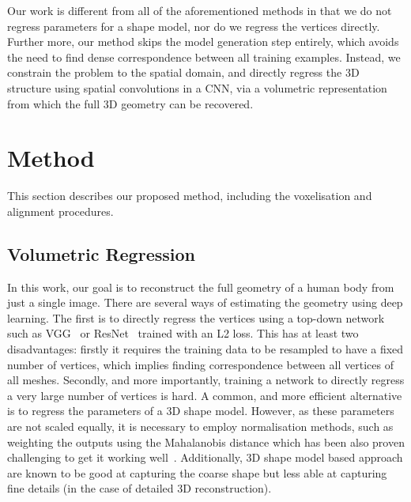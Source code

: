 Our work is different from all of the aforementioned methods in that
we do not regress parameters for a shape model, nor do we regress the
vertices directly. Further more, our method skips the model generation
step entirely, which avoids the need to find dense correspondence
between all training examples. Instead, we constrain the problem to
the spatial domain, and directly regress the 3D structure using
spatial convolutions in a CNN, via a volumetric representation from
which the full 3D geometry can be recovered.



\section{Method}

This section describes our proposed method, including the voxelisation
and alignment procedures.

\subsection{Volumetric Regression}

In this work, our goal is to reconstruct the full geometry of a human
body from just a single image.  There are several ways of estimating
the geometry using deep learning. The first is to directly regress the
vertices using a top-down network such as VGG~\cite{simonyan2014very}
or ResNet~\cite{he2016deep} trained with an L2 loss. This has at least
two disadvantages: firstly it requires the training data to be
resampled to have a fixed number of vertices, which implies finding
correspondence between all vertices of all meshes. Secondly, and more
importantly, training a network to directly regress a very large
number of vertices is hard. A common, and more efficient alternative
is to regress the parameters of a 3D shape model. However, as these
parameters are not scaled equally, it is necessary to employ
normalisation methods, such as weighting the outputs using the
Mahalanobis distance which has been also proven challenging to get it
working well~\cite{jackson2017vrn}. Additionally, 3D shape model based
approach are known to be good at capturing the coarse shape but less
able at capturing fine details (in the case of detailed 3D
reconstruction).


